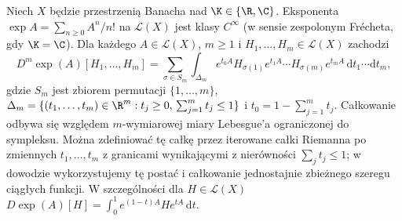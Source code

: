 \begin{twierdzenie}
\label{thm:exp-derivatives15}
Niech $X$ będzie przestrzenią Banacha nad $\K\in\{\R,\C\}$.
Eksponenta $\exp A=\sum_{n\ge0}A^n/n!$ na $\mathcal L(X)$
jest klasy $C^\infty$ (w sensie zespolonym Frécheta, gdy $\K=\C$). Dla każdego $A\in\mathcal L(X)$, $m\ge1$ i $H_1,\ldots,H_m\in\mathcal L(X)$ zachodzi
\[
 D^m\exp(A)[H_1,\ldots,H_m]
 =\sum_{\sigma\in S_m}\int_{\Delta_m}
 e^{t_0 A} H_{\sigma(1)}e^{t_1 A}\cdots
 H_{\sigma(m)}e^{t_m A}\,\mathrm dt_1\cdots\mathrm dt_m,
\]
gdzie $S_m$ jest zbiorem permutacji $\{1,\ldots,m\}$, $\Delta_m=\{(t_1,\ldots,t_m)\in\R^m:t_j\ge0,\,
\sum_{j=1}^m t_j\le1\}$ i $t_0=1-\sum_{j=1}^m t_j$.
Całkowanie odbywa się względem $m$-wymiarowej miary Lebesgue'a ograniczonej do sympleksu. Można zdefiniować tę całkę przez iterowane całki Riemanna po zmiennych $t_1,\ldots,t_m$ z granicami wynikającymi z nierówności $\sum_jt_j\le1$; w dowodzie wykorzystujemy tę postać i całkowanie jednostajnie zbieżnego szeregu ciągłych funkcji. W szczególności dla $H\in\mathcal L(X)$
$D\exp(A)[H]=\int_0^1 e^{(1-t)A}He^{tA}\,\mathrm dt$.
\end{twierdzenie}

